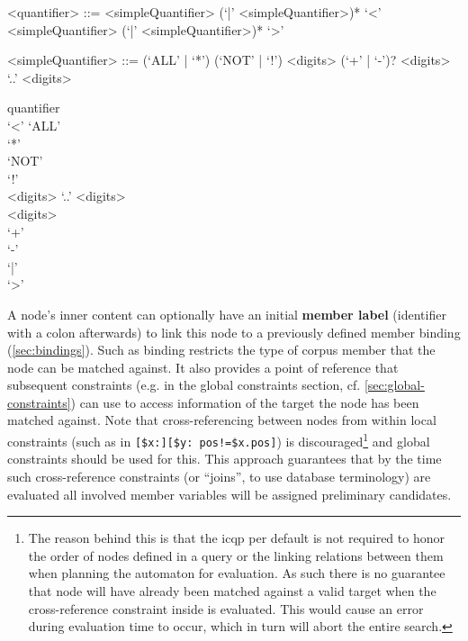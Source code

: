 \documentclass[11pt,a4paper]{article}
\begin{document}
\begin{gram}
	\label{gram:quantifier}
	\begin{grammar}			
		<quantifier> ::= <simpleQuantifier> (`|' <simpleQuantifier>)*
		\alt `\textless' <simpleQuantifier> (`|' <simpleQuantifier>)* `\textgreater'
		
		<simpleQuantifier> ::=  (`ALL' | `*')
		\alt (`NOT' | `!')
		\alt <digits> (`+' | `-')?
		\alt <digits> `..' <digits>
	\end{grammar}
	\diagsep	
	\begin{rrdiag*}{quantifier}
		\sst \\ `\textless' \est \srp
		\sst `ALL' \\ `*' \\ `NOT' \\ `!' \\ <digits> `..' <digits> \\ 
		<digits> \sst \\ `+' \\ `-' \est 
		\est
		\\ `|' \erp \sst \\ `\textgreater' \est
	\end{rrdiag*}
\end{gram}

A node's inner content can optionally have an initial \textbf{member label} (identifier with a colon \lit{:} afterwards) to link this node to a previously defined member binding (\ref{sec:bindings}).
Such as binding restricts the type of corpus member that the node can be matched against.
It also provides a point of reference that subsequent constraints (e.g. in the global constraints section, cf. \cref{sec:global-constraints}) can use to access information of the target the node has been matched against.
Note that cross-referencing between nodes from within local constraints (such as in \verb|[$x:][$y: pos!=$x.pos]|) is discouraged\footnote{The reason behind this is that the \ac{icqp} per default is not required to honor the order of nodes defined in a query or the linking relations between them when planning the automaton for evaluation. As such there is no guarantee that node  will have already been matched against a valid target when the cross-reference constraint inside  is evaluated. This would cause an error during evaluation time to occur, which in turn will abort the entire search.} and global constraints should be used for this.
This approach guarantees that by the time such cross-reference constraints (or ``joins'', to use database terminology) are evaluated all involved member variables will be assigned preliminary candidates.
\end{document}
